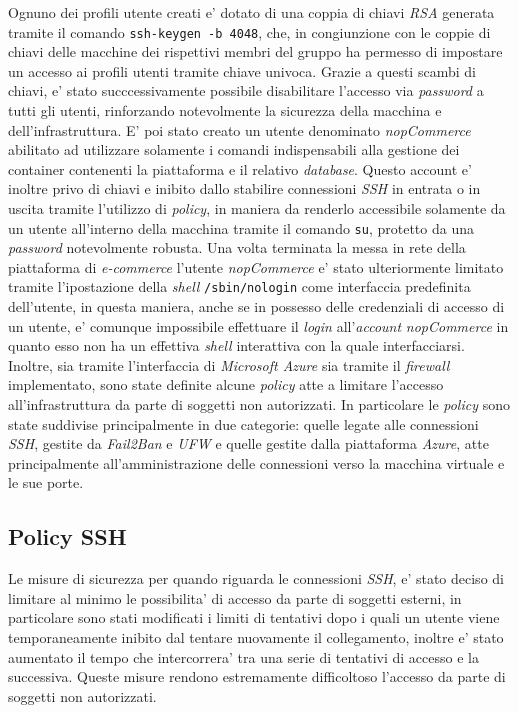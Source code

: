 \documentclass[a4paper]{report}
\begin{document}
		Ognuno dei profili utente creati e' dotato di una coppia di chiavi \emph{RSA} generata tramite il comando
		\texttt{ssh-keygen -b 4048}, che, in congiunzione con le coppie di chiavi delle macchine dei rispettivi membri
		del gruppo ha permesso di impostare un accesso ai profili utenti tramite chiave univoca. 
		Grazie a questi scambi di chiavi, e' stato succcessivamente possibile disabilitare l'accesso via \emph{password}
		a tutti gli utenti, rinforzando notevolmente la sicurezza della macchina e dell'infrastruttura. E' poi stato
		creato un utente denominato \emph{nopCommerce} abilitato ad utilizzare solamente i comandi indispensabili alla
		gestione dei container contenenti la piattaforma e il relativo \emph{database}. Questo account e' inoltre privo
		di chiavi e inibito dallo stabilire connessioni \emph{SSH} in entrata o in uscita tramite l'utilizzo di
		\emph{policy}, in maniera da renderlo accessibile solamente da un utente all'interno della macchina tramite il
		comando \texttt{su}, protetto da una \emph{password} notevolmente robusta. Una volta terminata la messa in rete
		della piattaforma di \emph{e-commerce} l'utente \emph{nopCommerce} e' stato ulteriormente limitato tramite
		l'ipostazione della \emph{shell} \texttt{/sbin/nologin} come interfaccia predefinita dell'utente, in questa
		maniera, anche se in possesso delle credenziali di accesso di un utente, e' comunque impossibile effettuare il
		\emph{login} all'\emph{account} \emph{nopCommerce} in quanto esso non ha un effettiva \emph{shell} interattiva
		con la quale interfacciarsi.
		Inoltre, sia tramite l'interfaccia di \emph{Microsoft Azure} sia tramite il \emph{firewall} implementato, sono
		state definite alcune \emph{policy} atte a limitare l'accesso all'infrastruttura da parte di soggetti non
		autorizzati. In particolare le \emph{policy} sono state suddivise principalmente in due categorie: quelle legate
		alle connessioni \emph{SSH}, gestite da \emph{Fail2Ban} e \emph{UFW} e quelle gestite dalla piattaforma
		\emph{Azure}, atte principalmente all'amministrazione delle connessioni verso la macchina virtuale e le sue
		porte.

		\subsection{Policy SSH}\label{policy_ssh}
			Le misure di sicurezza per quando riguarda le connessioni \emph{SSH}, e' stato deciso di limitare al minimo
			le possibilita' di accesso da parte di soggetti esterni, in particolare sono stati modificati i limiti di
			tentativi dopo i quali un utente viene temporaneamente inibito dal tentare nuovamente il collegamento,
			inoltre e' stato aumentato il tempo che intercorrera' tra una serie di tentativi di accesso e la successiva.
			Queste misure rendono estremamente difficoltoso l'accesso da parte di soggetti non autorizzati.
			
\end{document}

